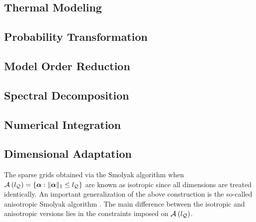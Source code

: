 \subsection{Thermal Modeling} 

\subsection{Probability Transformation} 

\subsection{Model Order Reduction} 

\subsection{Spectral Decomposition} 


\subsection{Numerical Integration} 


\subsection{Dimensional Adaptation} 
The sparse grids obtained via the Smolyak algorithm when $\quadratureMultiindexSet{\nqlevel} = \{ \multiindex: \norm[1]{\multiindex} \leq \nqlevel \}$ are known as isotropic since all dimensions are treated identically.
An important generalization of the above construction is the so-called anisotropic Smolyak algorithm \cite{nobile2008}.
The main difference between the isotropic and anisotropic versions lies in the constraints imposed on $\quadratureMultiindexSet{\nqlevel}$.
